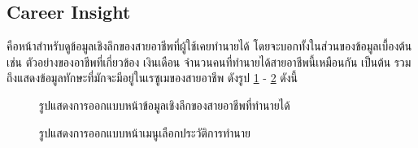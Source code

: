 \subsection{Career Insight}
คือหน้าสำหรับดูข้อมูลเชิงลึกของสายอาชีพที่ผู้ใช้เคยทำนายได้ โดยจะบอกทั้งในส่วนของข้อมูลเบื้องต้น เช่น ตัวอย่างของอาชีพที่เกี่ยวข้อง เงินเดือน จำนวนคนที่ทำนายได้สายอาชีพนี้เหมือนกัน เป็นต้น รวมถึงแสดงข้อมูลทักษะที่มักจะมีอยู่ในเรซูเมของสายอาชีพ ดังรูป \ref{fig:CI.png} - \ref{fig:CI-dropdown.png} ดังนี้
\begin{figure}[H]\centering
    \caption{รูปแสดงการออกแบบหน้าข้อมูลเชิงลึกของสายอาชีพที่ทำนายได้}\label{fig:CI.png}
\end{figure}
\begin{figure}[H]\centering
    \caption{รูปแสดงการออกแบบหน้าเมนูเลือกประวัติการทำนาย}\label{fig:CI-dropdown.png}
\end{figure}

